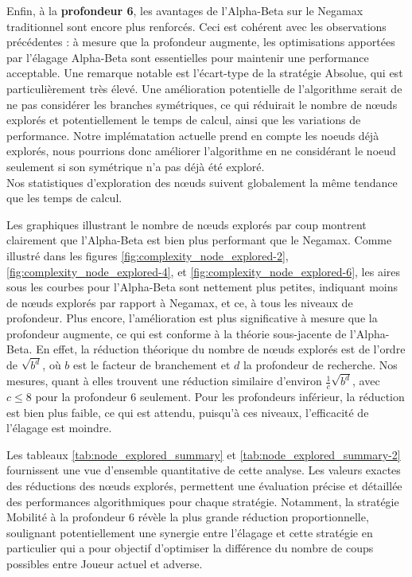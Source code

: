 Enfin, à la \textbf{profondeur 6}, les avantages de l'Alpha-Beta sur le Negamax traditionnel sont encore plus renforcés. Ceci est cohérent avec les observations précédentes : à mesure que la profondeur augmente, les optimisations apportées par l'élagage Alpha-Beta sont essentielles pour maintenir une performance acceptable. Une remarque notable est l'écart-type de la stratégie Absolue, qui est particulièrement très élevé. Une amélioration potentielle de l'algorithme serait de ne pas considérer les branches symétriques, ce qui réduirait le nombre de nœuds explorés et potentiellement le temps de calcul, ainsi que les variations de performance. Notre implématation actuelle prend en compte les noeuds déjà explorés, nous pourrions donc améliorer l'algorithme en ne considérant le noeud seulement si son symétrique n'a pas déjà été exploré.
\leavevmode\\
Nos statistiques d'exploration des nœuds suivent globalement la même tendance que les temps de calcul.

Les graphiques illustrant le nombre de nœuds explorés par coup montrent clairement que l'Alpha-Beta est bien plus performant que le Negamax. Comme illustré dans les figures \ref{fig:complexity_node_explored-2}, \ref{fig:complexity_node_explored-4}, et \ref{fig:complexity_node_explored-6}, les aires sous les courbes pour l'Alpha-Beta sont nettement plus petites, indiquant moins de nœuds explorés par rapport à Negamax, et ce, à tous les niveaux de profondeur. Plus encore, l'amélioration est plus significative à mesure que la profondeur augmente, ce qui est conforme à la théorie sous-jacente de l'Alpha-Beta. En effet, la réduction théorique du nombre de nœuds explorés est de l'ordre de $\sqrt{b^d}$, où $b$ est le facteur de branchement et $d$ la profondeur de recherche. Nos mesures, quant à elles trouvent une réduction similaire d'environ $\frac{1}{c}\sqrt{b^d}$, avec $c\leq8$ pour la profondeur 6 seulement. Pour les profondeurs inférieur, la réduction est bien plus faible, ce qui est attendu, puisqu'à ces niveaux, l'efficacité de l'élagage est moindre.

Les tableaux \ref{tab:node_explored_summary} et \ref{tab:node_explored_summary-2} fournissent une vue d'ensemble quantitative de cette analyse. Les valeurs exactes des réductions des nœuds explorés, permettent une évaluation précise et détaillée des performances algorithmiques pour chaque stratégie. Notamment, la stratégie Mobilité à la profondeur 6 révèle la plus grande réduction proportionnelle, soulignant potentiellement une synergie entre l'élagage et cette stratégie en particulier qui a pour objectif d'optimiser la différence du nombre de coups possibles entre Joueur actuel et adverse.

